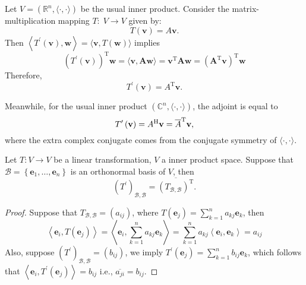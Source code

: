 \begin{example} Let \(V = ({\mathbb{R}}^{n},\langle  \cdot , \cdot  \rangle)\) be the usual inner product. Consider the matrix-multiplication mapping \(T : \;V \rightarrow  V\) given by:
\[
T\left( \mathbf{v}\right)  = A\mathbf{v}.
\]
Then \(\left\langle  {{T}^{\prime }\left( \mathbf{v}\right),\mathbf{w}}\right\rangle   = \langle \mathbf{v},T\left( \mathbf{w}\right) \rangle\) implies
\[
{\left( {T}^{\prime }\left( \mathbf{v}\right) \right) }^{\mathrm{T}}\mathbf{w} = \langle \mathbf{v},\mathbf{A}\mathbf{w}\rangle
= {\mathbf{v}}^{\mathrm{T}}\mathbf{A}\mathbf{w}
= {\left( {\mathbf{A}}^{\mathrm{T}}\mathbf{v}\right) }^{\mathrm{T}}\mathbf{w}
\]
Therefore, 
\[{T}^{\prime }\left( \mathbf{v}\right)  = {A}^{\mathrm{T}}\mathbf{v}.\]

Meanwhile, for the usual inner product \(({\mathbb{C}}^{n},\langle  \cdot , \cdot  \rangle)\), the adjoint is equal to
\[{T}^{\prime }\left( \mathbf{v}\right)  = {A}^{\mathrm{H}}\mathbf{v} = \overline{A}^{\mathrm{T}}{\bf v},\]
where the extra complex conjugate comes from the conjugate symmetry of $\langle  \cdot , \cdot  \rangle$.
\end{example}

\begin{proposition} \label{prop:adjoint_matrix} Let \(T : V \rightarrow  V\) be a linear transformation, \(V\) a inner product space. Suppose that \(\mathcal{B} = \left\{  {{\mathbf{e}}_{1},\ldots,{\mathbf{e}}_{n}}\right\}\) is an orthonormal basis of \(V\), then
\[
{\left( {T}^{\prime }\right) }_{\mathcal{B},\mathcal{B}} = \overline{{\left( T_{\mathcal{B},\mathcal{B}}\right) }^{\mathrm{T}}}.
\]
\end{proposition}

\begin{proof} Suppose that \(T_{\mathcal{B},\mathcal{B}} = \left( {a}_{ij}\right)\), where \(T\left( {\mathbf{e}}_{j}\right)  = \mathop{\sum }\limits_{{k = 1}}^{n}{a}_{kj}{\mathbf{e}}_{k}\), then
\[
\left\langle  {{\mathbf{e}}_{i},T\left( {\mathbf{e}}_{j}\right) }\right\rangle   = \left\langle  {{\mathbf{e}}_{i},\mathop{\sum }\limits_{{k = 1}}^{n}{a}_{kj}{\mathbf{e}}_{k}}\right\rangle
= \mathop{\sum }\limits_{{k = 1}}^{n}{a}_{kj}\left\langle  {{\mathbf{e}}_{i},{\mathbf{e}}_{k}}\right\rangle
= {a}_{ij}
\]
Also, suppose \({\left( {T}^{\prime }\right) }_{\mathcal{B},\mathcal{B}} = \left( {b}_{ij}\right)\), we imply \({T}^{\prime }\left( {\mathbf{e}}_{j}\right)  = \mathop{\sum }\limits_{{k = 1}}^{n}{b}_{ij}{\mathbf{e}}_{k}\), which follows that
\(
\left\langle  {{\mathbf{e}}_{i},{T}^{\prime }\left( {\mathbf{e}}_{j}\right) }\right\rangle   = {b}_{ij}
\)
i.e., \(\overline{{a}_{ji}} = {b}_{ij}\).
\end{proof}

